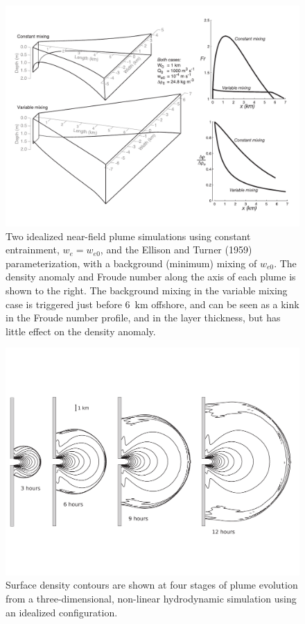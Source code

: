 \documentclass[12pt]{article}
\begin{document}
{\begin{figure}[p]
    \centering
    \includegraphics[width=6.5in]{Figures/plume3d_Fr_dr.pdf}
    \caption{Two idealized near-field plume simulations using constant entrainment, $w_e=w_{e0}$, and the Ellison and Turner (1959) parameterization, with a background (minimum) mixing of $w_{e0}$. The density anomaly and Froude number along the axis of each plume is shown to the right. The background mixing in the variable mixing case is triggered just before 6~km offshore, and can be seen as a kink in the Froude number profile, and in the layer thickness, but has little effect on the density anomaly. }
    \label{fig:plume3d_Fr_dr}
\end{figure}

\begin{figure}[p]
    \centering
    \includegraphics[width=6in]{Figures/plume_expansion_frames.pdf}
    \caption{Surface density contours are shown at four stages of plume evolution from a three-dimensional, non-linear hydrodynamic simulation using an idealized configuration.}
    \label{fig:3d_expansion}
\end{figure}


}
\end{document}
